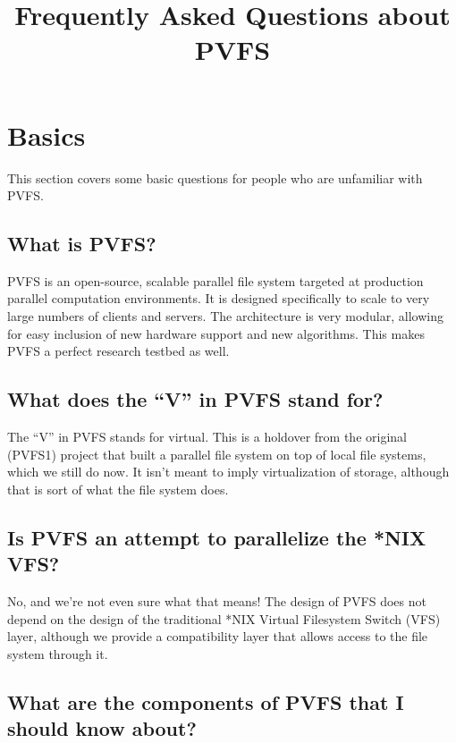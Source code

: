 \documentclass[11pt,letterpaper]{article}
\title{Frequently Asked Questions about PVFS}
\begin{document}
\maketitle

\tableofcontents

\thispagestyle{empty}

%
%
\section{Basics}

This section covers some basic questions for people who are unfamiliar with PVFS.

\subsection{What is PVFS?}

PVFS is an open-source, scalable parallel file system targeted at production
parallel computation environments.  It is designed specifically to scale to
very large numbers of clients and servers.  The architecture is very modular,
allowing for easy inclusion of new hardware support and new algorithms.  This
makes PVFS a perfect research testbed as well.

\subsection{What does the ``V'' in PVFS stand for?}

The ``V'' in PVFS stands for virtual.  This is a holdover from the original
(PVFS1) project that built a parallel file system on top of local file
systems, which we still do now.  It isn't meant to imply virtualization of
storage, although that is sort of what the file system does.

\subsection{Is PVFS an attempt to parallelize the *NIX VFS?}

No, and we're not even sure what that means!  The design of PVFS does
not depend on the design of the traditional *NIX Virtual Filesystem
Switch (VFS) layer, although we provide a compatibility layer that
allows access to the file system through it.

\subsection{What are the components of PVFS that I should know about?}
\end{document}
